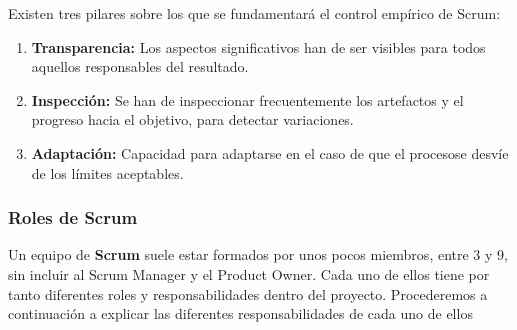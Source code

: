\newpage
Existen tres pilares sobre los que se fundamentará el control empírico de Scrum:

\begin{enumerate}
	\item \textbf{Transparencia:} Los aspectos significativos han de ser visibles para todos aquellos responsables del resultado.
	\item \textbf{Inspección:} Se han de inspeccionar frecuentemente los artefactos y el progreso hacia el objetivo, para detectar variaciones.
	\item \textbf{Adaptación:}  Capacidad para adaptarse en el caso de que el procesose desvíe de los límites aceptables.
\end{enumerate}

\subsubsection{Roles de Scrum}

Un equipo de \textbf{Scrum} suele estar formados por unos pocos miembros, entre 3 y 9, sin incluir al Scrum Manager y el Product Owner. Cada uno de ellos tiene por tanto diferentes roles y responsabilidades dentro del proyecto. Procederemos a continuación a explicar las diferentes responsabilidades de cada uno de ellos

